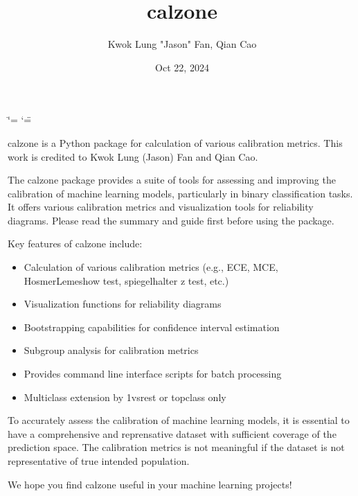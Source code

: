 \documentclass[letterpaper,10pt,english]{sphinxmanual}
\title{calzone}
\date{Oct 22, 2024}
\author{Kwok Lung "Jason" Fan, Qian Cao}
\begin{document}
\ifdefined\shorthandoff
  \ifnum\catcode`\=\string=\active\shorthandoff{=}\fi
  \ifnum\catcode`\"=\active{}\fi
\fi

\pagestyle{empty}
\sphinxmaketitle
\pagestyle{plain}
\sphinxtableofcontents
\pagestyle{normal}
\label{\detokenize{index::doc}}


\sphinxAtStartPar
calzone is a Python package for calculation of various calibration metrics. This work is credited to Kwok Lung (Jason) Fan and Qian Cao.

\sphinxAtStartPar
The calzone package provides a suite of tools for assessing and improving the calibration of machine learning models, particularly in binary classification tasks. It offers various calibration metrics and visualization tools for reliability diagrams.  Please read the summary and guide first  before using the package.

\sphinxAtStartPar
Key features of calzone include:
\begin{itemize}
\item {} 
\sphinxAtStartPar
Calculation of various calibration metrics (e.g., ECE, MCE, Hosmer\sphinxhyphen{}Lemeshow test, spiegelhalter z test, etc.)

\item {} 
\sphinxAtStartPar
Visualization functions for reliability diagrams

\item {} 
\sphinxAtStartPar
Bootstrapping capabilities for confidence interval estimation

\item {} 
\sphinxAtStartPar
Subgroup analysis for calibration metrics

\item {} 
\sphinxAtStartPar
Provides command line interface scripts for batch processing

\item {} 
\sphinxAtStartPar
Multi\sphinxhyphen{}class extension by 1\sphinxhyphen{}vs\sphinxhyphen{}rest or top\sphinxhyphen{}class only

\end{itemize}

\sphinxAtStartPar
To accurately assess the calibration of machine learning models, it is essential to have a comprehensive and reprensative dataset with sufficient coverage of the prediction space. The calibration metrics is not meaningful if the dataset is not representative of true intended population.

\sphinxAtStartPar
We hope you find calzone useful in your machine learning projects!
\end{document}
